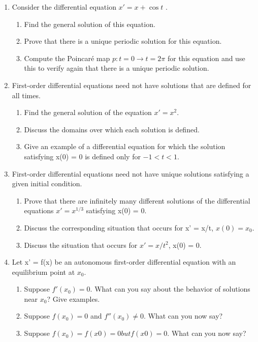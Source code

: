 \documentclass[12pt]{article}
\begin{document}
\begin{enumerate}
\item Consider the differential equation $x' = x + \cos t$ .

\begin{enumerate}
\item Find the general solution of this equation.
\item Prove that there is a unique periodic solution for this equation.
\item Compute the Poincaré map $p:{t = 0} \to {t = 2\pi}$ for this equation and use this to verify again that there is a unique periodic
solution.
\end{enumerate}

\item First-order differential equations need not have solutions that are defined
for all times.

\begin{enumerate}
\item Find the general solution of the equation $x' = x^2$.
\item Discuss the domains over which each solution is defined.
\item Give an example of a differential equation for which the solution
satisfying x(0) = 0 is defined only for $-1 < t < 1$.
\end{enumerate}

\item First-order differential equations need not have unique solutions satisfying
a given initial condition.

\begin{enumerate}
\item Prove that there are infinitely many different solutions of the
differential equations $x' = x^{1/3}$ satisfying x(0) = 0.
\item Discuss the corresponding situation that occurs for x' = x/t,
$x(0) = x_0$.
\item Discuss the situation that occurs for $x' = x/t^2$, x(0) = 0.
\end{enumerate}

\item Let x' = f(x) be an autonomous first-order differential equation with an equilibrium point at $x_0$.

\begin{enumerate}
\item Suppose $f'(x_0) = 0$. What can you say about the behavior of
solutions near $x_0$? Give examples.
\item Suppose $f(x_0) = 0$ and $f''(x_0) \neq 0$. What can you now say?
\item Suppose $f(x_0) = f(x0) = 0 but f(x0)= 0$. What can you now
say?
\end{enumerate}


\end{enumerate}
\end{document}
